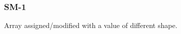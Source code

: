 \subsubsection{SM-1}\label{sec:error_code_sm_1}

Array assigned/modified with a value of different shape.


